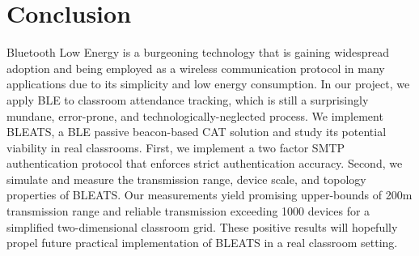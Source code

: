 \section{Conclusion} 

\label{sec:conclusion}

Bluetooth Low Energy is a burgeoning technology that is gaining widespread
adoption and being employed as a wireless communication protocol in many
applications due to its simplicity and low energy consumption. In our project,
we apply BLE to classroom attendance tracking, which is still a surprisingly
mundane, error-prone, and technologically-neglected process. We implement
BLEATS, a BLE passive beacon-based CAT solution and study its potential
viability in real classrooms. First, we implement a two factor SMTP
authentication protocol that enforces strict authentication accuracy. Second,
we simulate and measure the transmission range, device scale, and topology
properties of BLEATS. Our measurements yield promising upper-bounds of 200m
transmission range and reliable transmission exceeding 1000 devices for a
simplified two-dimensional classroom grid. These positive results will
hopefully propel future practical implementation of BLEATS in a real classroom
setting.




